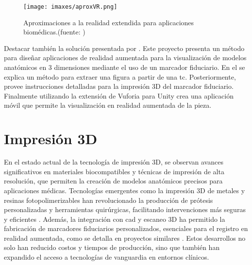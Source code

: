 \begin{figure}
	\centering
	\texttt{[image: imaxes/aproxVR.png]}
	\caption{Aproximaciones a la realidad extendida para aplicaciones biomédicas.(fuente: \cite{Venkatesan2021})}
	\label{fig:vrAproximations}
\end{figure}

Destacar también la solución presentada por \cite{MoretaMartinez2020}. Este proyecto presenta un método para diseñar aplicaciones de realidad aumentada para la visualización de modelos anatómicos en 3 dimensiones mediante el uso de un marcador fiduciario. En el se explica un método para extraer una figura a partir de una \acrshort{tc}. Posteriormente, provee instrucciones detalladas para la impresión 3D del marcador fiduciario. Finalmente utilizando la extensión de Vuforia para Unity crea una aplicación móvil que permite la visualización en realidad aumentada de la pieza.

\section{Impresión 3D}
En el estado actual de la tecnología de impresión 3D, se observan avances significativos en materiales biocompatibles y técnicas de impresión de alta resolución, que permiten la creación de modelos anatómicos precisos para aplicaciones médicas. Tecnologías emergentes como la impresión 3D de metales y resinas fotopolimerizables han revolucionado la producción de prótesis personalizadas y herramientas quirúrgicas, facilitando intervenciones más seguras y eficientes \cite{Gonzalez_Alvarez_2021}. Además, la integración con \acrfull{cad} y escaneo 3D ha permitido la fabricación de marcadores fiduciarios personalizados, esenciales para el registro en realidad aumentada, como se detalla en proyectos similares \cite{MoretaMartinez2020}. Estos desarrollos no solo han reducido costos y tiempos de producción, sino que también han expandido el acceso a tecnologías de vanguardia en entornos clínicos.
